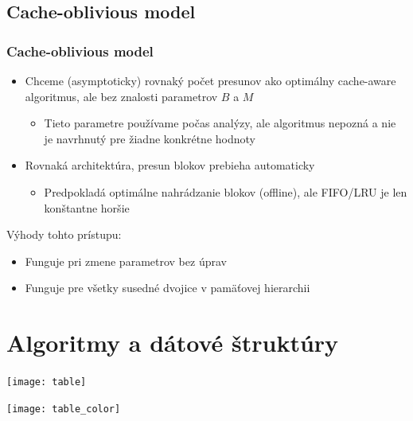 \documentclass{beamer}
\begin{document}
\subsection{Cache-oblivious model}
\begin{frame}
	\frametitle{Cache-oblivious model}%
	\begin{itemize}
		\item Chceme (asymptoticky) rovnaký počet presunov ako optimálny cache-aware algoritmus, ale bez znalosti parametrov $B$ a $M$
		\begin{itemize}
		    \item Tieto parametre používame počas analýzy, ale algoritmus nepozná a nie je navrhnutý pre žiadne konkrétne hodnoty
		\end{itemize}
		\item Rovnaká architektúra, presun blokov prebieha automaticky
		\begin{itemize}
			\item Predpokladá optimálne nahrádzanie blokov (offline), ale FIFO/LRU je len konštantne horšie
		\end{itemize}
	\end{itemize}
	Výhody tohto prístupu:
	\begin{itemize}
	    \item Funguje pri zmene parametrov bez úprav
	    \item Funguje pre všetky susedné dvojice v pamäťovej hierarchii
	\end{itemize}
\end{frame}


\newcommand{\amort}{{\small \textit{amort.}}}
\newcommand{\toprule}{\hline}
\newcommand{\bottomrule}{\hline}
\newcommand{\aware}{Cache-aware}
\newcommand{\obliv}{Cache-oblivious}

\section{Algoritmy a dátové štruktúry}
\begin{frame}
    \texttt{[image: table]}
\end{frame}

\begin{frame}
    \texttt{[image: table\_color]}
\end{frame}
\end{document}
